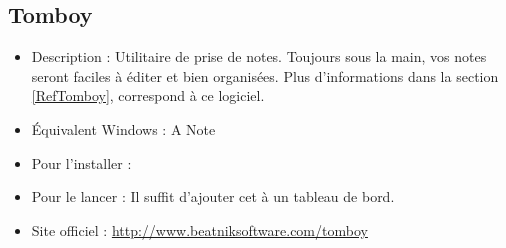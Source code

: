 
\subsection{Tomboy}
\begin{itemize}
\begingroup
{}
\item Description : Utilitaire de prise de notes. Toujours sous la main, vos notes seront faciles à éditer et bien organisées. Plus d'informations dans la section \ref{RefTomboy}, correspond à ce logiciel.{\par}
\endgroup
\item Équivalent Windows : A Note{\par}
\item Pour l'installer : 
\item Pour le lancer : Il suffit d'ajouter cet  à un tableau de bord.{\par}
\item Site officiel : \url{http://www.beatniksoftware.com/tomboy}{\par}
\end{itemize}
